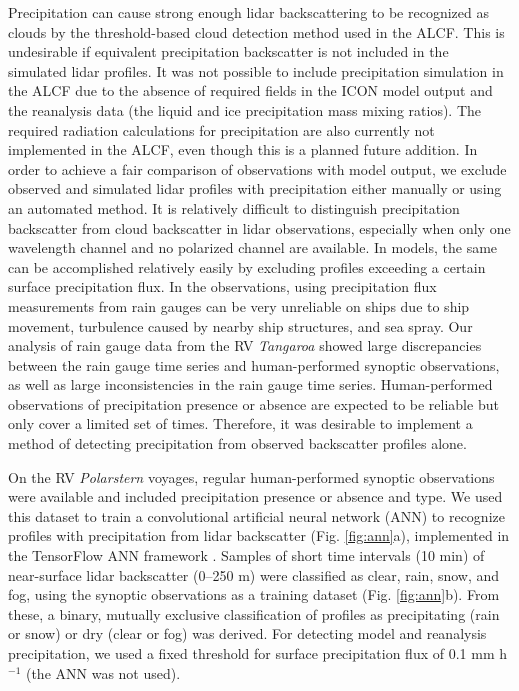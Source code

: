 \documentclass[draft]{agujournal2019}
\begin{document}
Precipitation can cause strong enough lidar backscattering to be recognized as clouds by the threshold-based cloud detection method used in the ALCF. This is undesirable if equivalent precipitation backscatter is not included in the simulated lidar profiles. It was not possible to include precipitation simulation in the ALCF due to the absence of required fields in the ICON model output and the reanalysis data (the liquid and ice precipitation mass mixing ratios). The required radiation calculations for precipitation are also currently not implemented in the ALCF, even though this is a planned future addition. In order to achieve a fair comparison of observations with model output, we exclude observed and simulated lidar profiles with precipitation either manually or using an automated method. It is relatively difficult to distinguish precipitation backscatter from cloud backscatter in lidar observations, especially when only one wavelength channel and no polarized channel are available. In models, the same can be accomplished relatively easily by excluding profiles exceeding a certain surface precipitation flux. In the observations, using precipitation flux measurements from rain gauges can be very unreliable on ships due to ship movement, turbulence caused by nearby ship structures, and sea spray. Our analysis of rain gauge data from the RV \emph{Tangaroa} showed large discrepancies between the rain gauge time series and human-performed synoptic observations, as well as large inconsistencies in the rain gauge time series. Human-performed observations of precipitation presence or absence are expected to be reliable but only cover a limited set of times. Therefore, it was desirable to implement a method of detecting precipitation from observed backscatter profiles alone.

On the RV \emph{Polarstern} voyages, regular human-performed synoptic observations were available and included precipitation presence or absence and type. We used this dataset to train a convolutional artificial neural network (ANN) to recognize profiles with precipitation from lidar backscatter (Fig. \ref{fig:ann}a), implemented in the TensorFlow ANN framework . Samples of short time intervals (10 min) of near-surface lidar backscatter (0–250 m) were classified as clear, rain, snow, and fog, using the synoptic observations as a training dataset (Fig. \ref{fig:ann}b). From these, a binary, mutually exclusive classification of profiles as precipitating (rain or snow) or dry (clear or fog) was derived. For detecting model and reanalysis precipitation, we used a fixed threshold for surface precipitation flux of 0.1 mm h$^{-1}$ (the ANN was not used).
\end{document}
